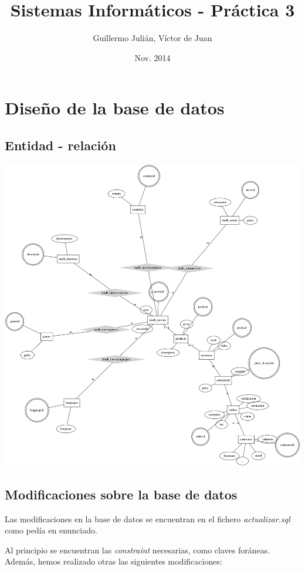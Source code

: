 \documentclass[nochap]{apuntes}
\title{Sistemas Informáticos - Práctica 3}
\author{Guillermo Julián, Víctor de Juan}
\date{Nov. 2014}
\begin{document}
\pagestyle{plain}
\maketitle

\tableofcontents
\newpage

\section{Diseño de la base de datos}
\subsection{Entidad - relación}
\includegraphics[scale=0.2]{ER.png}

\subsection{Modificaciones sobre la base de datos}

Las modificaciones en la base de datos se encuentran en el fichero \textit{actualizar.sql} como pedía en enunciado.


Al principio se encuentran las \textit{constraint} necesarias, como claves foráneas. Además, hemos realizado otras las siguientes modificaciones:
\end{document}
